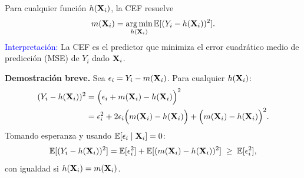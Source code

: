 \documentclass[9pt, xcolor=dvipsnames]{beamer}
\begin{document}
\begin{frame}{}
\begin{tcolorbox}[colback=white, arc=0mm,boxrule=0.5pt, title=Teorema: Propiedad de predicción de la CEF, breakable]	
    Para cualquier función \(h(\textbf{X}_i)\), la CEF resuelve
    \begin{equation*}
        m(\XB_i) = \argmin_{h(\XB_i)} \EX[(Y_i - h(\XB_i))^2].    
    \end{equation*}
    \textcolor{blue}{Interpretación:} La CEF es el predictor que minimiza el error cuadrático medio de predicción (MSE) de \( Y_i \) dado \( \textbf{X}_i \).
    \end{tcolorbox}
    \textbf{Demostración breve.} Sea \(\epsilon_i = Y_i-m(\textbf{X}_i)\). Para cualquier \(h(\textbf{X}_i)\):
    \begin{align*}
        (Y_i-h(\textbf{X}_i))^2 &= \Big(\epsilon_i + m(\textbf{X}_i) - h(\textbf{X}_i)\Big)^2 \\
        &= \epsilon_i^2 + 2 \epsilon_i\Big(m(\textbf{X}_i)-h(\textbf{X}_i)\Big) + \Big(m(\textbf{X}_i)-h(\textbf{X}_i)\Big)^2.
    \end{align*}
Tomando esperanza y usando \(\operatorname{\mathbb{E}}[\epsilon_i\mid \textbf{X}_i]=0\):
\[
\operatorname{\mathbb{E}}[(Y_i-h(\textbf{X}_i))^2] = \operatorname{\mathbb{E}}[\epsilon_i^2] + \operatorname{\mathbb{E}}[(m(\textbf{X}_i)-h(\textbf{X}_i))^2] \;\ge\; \operatorname{\mathbb{E}}[\epsilon_i^2],
\]
con igualdad si \(h(\textbf{X}_i)=m(\textbf{X}_i)\).
\end{frame}
\end{document}
